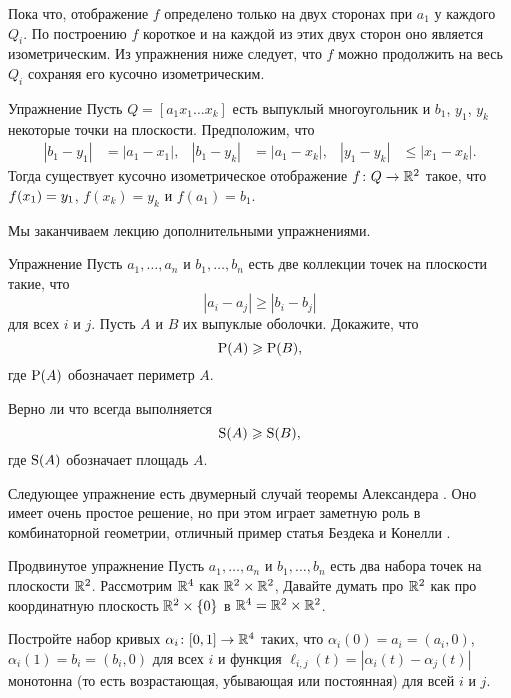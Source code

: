 Пока что, отображение $f$ определено только на двух сторонах при $a_1$ у каждого $Q_i$.
По построению $f$ короткое и на каждой из этих двух сторон оно является изометрическим.
Из упражнения ниже следует, что 
$f$ можно продолжить на весь $Q_i$ сохраняя его кусочно изометрическим.
\qeds

\begin{thm}{Упражнение}\label{ex:triangle-reflect}
Пусть $Q=[a_1x_1\dots x_k]$ есть выпуклый многоугольник и $b_1$, $y_1$, $y_k$ некоторые точки на плоскости.
Предположим, что 
\begin{align*}
|b_1-y_1|&=|a_1-x_1|,&
|b_1-y_k|&=|a_1-x_k|,&
|y_1-y_k|&\le|x_1-x_k|.
\end{align*}
Тогда существует кусочно изометрическое отображение 
$f\colon Q\to \mathbb{R}^2$ такое, что  $f(x_1)\z=y_1$, $f(x_k)= y_k$ и $f(a_1)= b_1$.
\end{thm}

Мы заканчиваем лекцию дополнительными упражнениями.

\begin{thm}{Упражнение}\label{pr:perimeter}
Пусть $a_1,\dots,a_n$ и $b_1,\dots,b_n$ 
есть две коллекции точек на плоскости такие, что
$$|a_i-a_j|\ge |b_i-b_j|$$
для всех $i$ и $j$.
Пусть $A$ 
и $B$ их выпуклые оболочки.
Докажите, что 
$$\operatorname{\rm P} (A)\geqslant \operatorname{\rm P} (B),$$
где $\operatorname{\rm P} (A)$ обозначает периметр  $A$.

Верно ли что всегда выполняется
$$\operatorname{\rm S} (A)\geqslant \operatorname{\rm S} (B),$$
где $\operatorname{\rm S} (A)$ обозначает площадь  $A$.

\end{thm}

Следующее упражнение есть двумерный случай теоремы Александера 
\cite{alexander}.
Оно имеет очень простое решение, но при этом играет заметную роль в комбинаторной геометрии,
отличный пример статья Бездека и Конелли \cite{bezdek-connelly}.

\begin{thm}{Продвинутое упражнение}\label{pr:alexander}
Пусть $a_1,\dots,a_n$ и $b_1,\dots,b_n$ 
есть два набора точек на плоскости $\mathbb{R}^2$.
Рассмотрим $\mathbb{R}^4$ как $\mathbb{R}^2 \times \mathbb{R}^2$, 
Давайте думать про $\mathbb{R}^2$ как про координатную плоскость  $\mathbb{R}^2 \times \{0\}$ в $\mathbb{R}^4=\mathbb{R}^2 \times \mathbb{R}^2$.

Постройте набор кривых  $\alpha_i\colon[0,1]\to \mathbb{R}^4$ 
таких, что
$\alpha_i(0)=a_i=(a_i,0)$, 
$\alpha_i(1)=b_i=(b_i,0)$ для всех $i$
и функция $\ell_{i,j}(t)=|\alpha_i(t)-\alpha_j(t)|$ 
монотонна (то есть возрастающая, убывающая или постоянная) для всей $i$ и $j$.
\end{thm}

